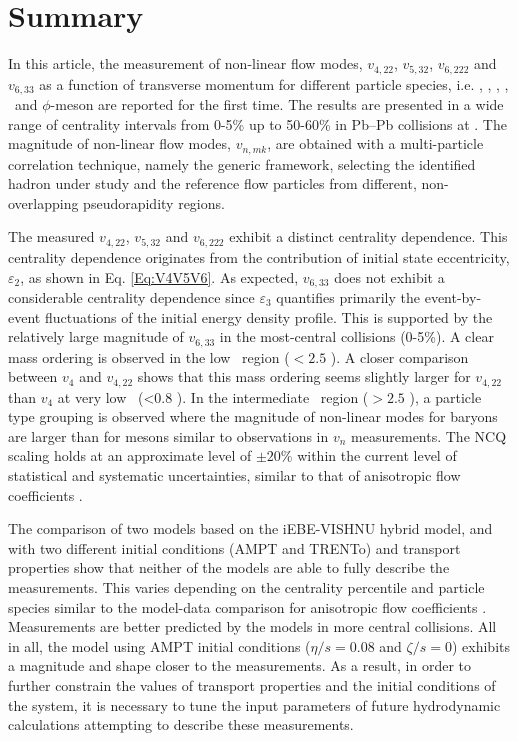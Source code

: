 \newpage

\section{Summary}
\label{Sec:conclusion}

In this article, the measurement of non-linear flow modes, $v_{4,22}$, $v_{5,32}$, $v_{6,222}$ and $v_{6,33}$ as a function of transverse momentum for different particle species, i.e. \pion, \kaon, \Ks, \proton, \lambdas~and $\phi$-meson are reported for the first time. The results are presented in a wide range of centrality intervals from 0-5\% up to 50-60\% in Pb--Pb collisions at \sNN. The magnitude of non-linear flow modes, $v_{n,mk}$, are obtained with a multi-particle correlation technique, namely the generic framework, selecting the identified hadron under study and the reference flow particles from different, non-overlapping pseudorapidity regions.  

The measured $v_{4,22}$, $v_{5,32}$ and $v_{6,222}$ exhibit a distinct centrality dependence. This centrality dependence originates from the contribution of initial state eccentricity, $\varepsilon_{2}$, as shown in Eq. \ref{Eq:V4V5V6}. As expected, $v_{6,33}$ does not exhibit a considerable centrality dependence since $\varepsilon_{3}$ quantifies primarily the event-by-event fluctuations of the initial energy density profile. This is supported by the relatively large magnitude of $v_{6,33}$ in the most-central collisions (0-5\%). A clear mass ordering is observed in the low \pT~region (\pT$< 2.5$ \GeV). A closer comparison between $v_{4}$ and $v_{4,22}$ shows that this mass ordering seems slightly larger for $v_{4,22}$ than $v_{4}$ at very low \pT~(\pT<0.8 \GeV). %
In the intermediate \pT~region (\pT$> 2.5$ \GeV), a particle type grouping is observed where the magnitude of non-linear modes for baryons are larger than for mesons similar to observations in $v_{n}$ measurements. The NCQ scaling holds at an approximate level of $\pm 20$\% within the current level of statistical and systematic uncertainties, similar to that of anisotropic flow coefficients \cite{Acharya:2018zuq}. 

The comparison of two models based on the iEBE-VISHNU hybrid model, and with two different initial conditions (AMPT and TRENTo) and transport properties show that neither of the models are able to fully describe the measurements. This varies depending on the centrality percentile and particle species similar to the model-data comparison for anisotropic flow coefficients \cite{Acharya:2018zuq}. Measurements are better predicted by the models in more central collisions. All in all, the model using AMPT initial conditions ($\eta/s = 0.08$ and $\zeta/s =0$) exhibits a magnitude and shape closer to the measurements. As a result, in order to further constrain the values of transport properties and the initial conditions of the system, it is necessary to tune the input parameters of future hydrodynamic calculations attempting to describe these measurements.